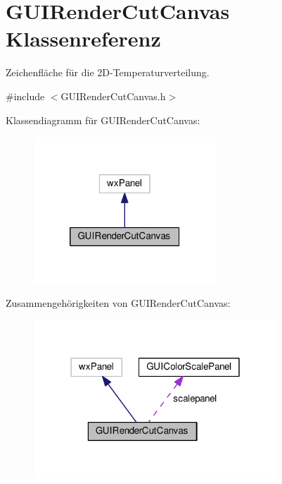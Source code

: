 \hypertarget{classGUIRenderCutCanvas}{\section{G\-U\-I\-Render\-Cut\-Canvas Klassenreferenz}
\label{classGUIRenderCutCanvas}
}


Zeichenfläche für die 2\-D-\/\-Temperaturverteilung.  




{\ttfamily \#include $<$G\-U\-I\-Render\-Cut\-Canvas.\-h$>$}



Klassendiagramm für G\-U\-I\-Render\-Cut\-Canvas\-:
\nopagebreak
\begin{figure}[H]
\begin{center}
\leavevmode
\includegraphics[width=194pt]{classGUIRenderCutCanvas__inherit__graph}
\end{center}
\end{figure}


Zusammengehörigkeiten von G\-U\-I\-Render\-Cut\-Canvas\-:
\nopagebreak
\begin{figure}[H]
\begin{center}
\leavevmode
\includegraphics[width=259pt]{classGUIRenderCutCanvas__coll__graph}
\end{center}
\end{figure}
